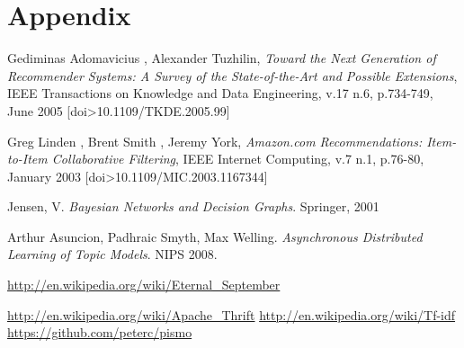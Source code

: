 \documentclass[11pt,letterpaper]{article}
\begin{document}
\section{Appendix}

\newpage
\newpage
\begin{thebibliography}{6}
   Gediminas Adomavicius , Alexander Tuzhilin, \textit{Toward the Next Generation of Recommender Systems: A Survey of the State-of-the-Art and Possible Extensions}, IEEE Transactions on Knowledge and Data Engineering, v.17 n.6, p.734-749, June 2005  [doi>10.1109/TKDE.2005.99]

   Greg Linden , Brent Smith , Jeremy York, \textit{Amazon.com Recommendations: Item-to-Item Collaborative Filtering}, IEEE Internet Computing, v.7 n.1, p.76-80, January 2003  [doi>10.1109/MIC.2003.1167344]

   Jensen, V. \textit{Bayesian Networks and Decision Graphs}. Springer, 2001

   Arthur Asuncion, Padhraic Smyth, Max Welling. \textit{Asynchronous Distributed Learning of Topic Models}. NIPS 2008.

   \url{http://en.wikipedia.org/wiki/Eternal\_September}

   \url{http://en.wikipedia.org/wiki/Apache\_Thrift}
   \url{http://en.wikipedia.org/wiki/Tf-idf}
   \url{https://github.com/peterc/pismo}


\end{thebibliography}

\newpage
\appendix
\end{document}
